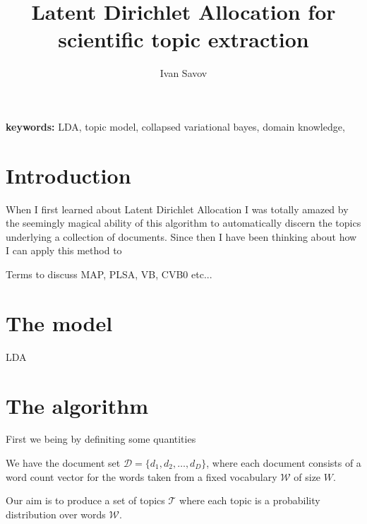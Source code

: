 \documentclass[11pt]{article}
\author{Ivan Savov}
\title{ {\Huge Latent Dirichlet Allocation for \\ scientific topic extraction } }
\newcommand{\DD}{\mathcal{D}}
\newcommand{\WW}{\mathcal{W}}
\newcommand{\TT}{\mathcal{T}}
\begin{document}
\maketitle



{\bf keywords: } LDA, topic model, collapsed variational bayes, domain knowledge, 



\section{Introduction}

	When I first learned about Latent Dirichlet Allocation I was totally amazed by the seemingly magical ability
	of this algorithm to automatically discern the topics underlying a collection of documents.
	Since then I have been thinking about how I can apply this method to  


    Terms to discuss MAP, PLSA, VB, CVB0 etc...


\section{The model}

    LDA 

\section{The algorithm}

    First we being by definiting some quantities
    
    We have the document set $\DD = \{ d_1, d_2, \ldots, d_D \}$, where each document consists of 
    a word count vector for the words taken from a fixed vocabulary $\WW$ of size $W$.
    
    Our aim is to produce a set of topics $\TT$ where each topic is a probability distribution over words $\WW$.
    
\end{document}
